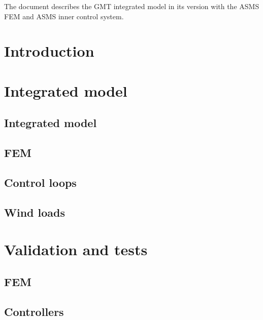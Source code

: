 \documentclass{gmto}
\begin{document}
The document describes the GMT integrated model in its version with the ASMS FEM
and ASMS inner control system.

\section{Introduction}
\label{sec:introduction}

\section{Integrated model}

\subsection{Integrated model}
\label{sec:im}

\subsection{FEM}
\label{sec:fem}



\clearpage
\subsection{Control loops}
\label{sec:ctrlr}






\subsection{Wind loads}
\label{sec:wind-loads}



\appendix

\section{Validation and tests}
\label{sec:tests}

\subsection{FEM}
\label{sec:fem-tests}

\subsection{Controllers}
\label{sec:ctrlr-tests}




\printbibliography
\end{document}
